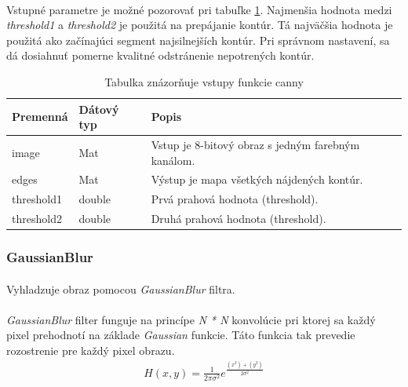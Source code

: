 \documentclass[12pt]{article}
\begin{document}
\paragraph{}
Vstupné parametre je možné pozorovať pri tabuľke \ref{cannyPar}.
Najmenšia hodnota medzi \emph{threshold1} a \emph{threshold2} je použitá na prepájanie kontúr. Tá najväčšia hodnota je použitá ako začínajúci segment najsilnejších kontúr.
Pri správnom nastavení, sa dá dosiahnuť pomerne kvalitné odstránenie nepotrených kontúr.
\cite{canny}
\cite{OpenCVDoc}
\begin{table}
	\centering
    \begin{tabular}{ | l | l | p{5cm} |}
    \hline
    Premenná & Dátový typ & Popis \\ \hline
    image & Mat & Vstup je 8-bitový obraz s jedným farebným kanálom. \\ \hline
    edges & Mat & Výstup je mapa všetkých nájdených kontúr. \\ \hline
    threshold1 & double & Prvá prahová hodnota (threshold). \\ \hline
    threshold2 & double & Druhá prahová hodnota (threshold). \\
    \hline
    \end{tabular}
  	\caption{Tabulka znázorňuje vstupy funkcie canny}
  	\label{cannyPar}
\end{table}
\subsubsection{GaussianBlur}
\paragraph{}
Vyhladzuje obraz pomocou \emph{GaussianBlur} filtra.
\cite{gaussianblur_doc}
\cite{OpenCVDoc}
\paragraph{}
\emph{GaussianBlur} filter funguje na princípe \emph{N * N} konvolúcie pri ktorej sa každý pixel prehodnotí na základe \emph{Gaussian} funkcie.
Táto funkcia tak prevedie rozostrenie pre každý pixel obrazu.
\cite{gaussianblur}
\begin{align*}
H(x,y) = \frac{1}{2\pi\sigma^2}e^{\frac{(x^2)+(y^2)}{2\sigma^2}}
\end{align*}
\end{document}
